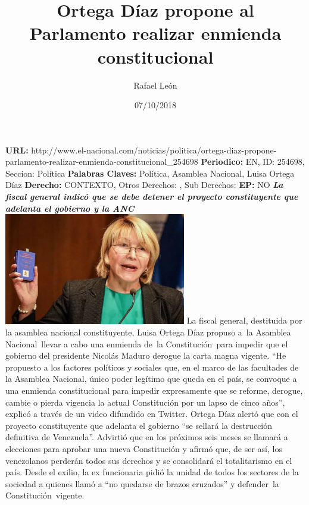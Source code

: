 \documentclass{article}%
\title{\textbf{Ortega Díaz propone al Parlamento realizar enmienda constitucional}}%
\author{Rafael León}%
\date{07/10/2018}%
\begin{document}
%
\normalsize%
\maketitle%
\textbf{URL: }%
http://www.el{-}nacional.com/noticias/politica/ortega{-}diaz{-}propone{-}parlamento{-}realizar{-}enmienda{-}constitucional\_254698\newline%
%
\textbf{Periodico: }%
EN, %
ID: %
254698, %
Seccion: %
Política\newline%
%
\textbf{Palabras Claves: }%
Política, Asamblea Nacional, Luisa Ortega Díaz\newline%
%
\textbf{Derecho: }%
CONTEXTO, %
Otros Derechos: %
, %
Sub Derechos: %
\newline%
%
\textbf{EP: }%
NO\newline%
\newline%
%
\textbf{\textit{La fiscal general indicó que se debe detener el proyecto constituyente que adelanta el gobierno y la ANC}}%
\newline%
\newline%
%
\includegraphics[width=300px]{17.jpg}%
\newline%
%
La fiscal general, destituida por la asamblea nacional constituyente, Luisa Ortega Díaz propuso a~la Asamblea Nacional~llevar a cabo una enmienda de~la Constitución~para impedir que el gobierno del presidente Nicolás Maduro derogue la carta magna vigente.%
\newline%
%
“He propuesto a los factores políticos y sociales que, en el marco de las facultades de la Asamblea Nacional, único poder legítimo que queda en el país, se convoque a una enmienda constitucional para impedir expresamente que se reforme, derogue, cambie o pierda vigencia la actual Constitución por un lapso de cinco años”, explicó a través de un video difundido en Twitter.%
\newline%
%
Ortega Díaz alertó que con el proyecto constituyente que adelanta el gobierno “se sellará la destrucción definitiva de Venezuela”. Advirtió que en los próximos seis meses se llamará a elecciones para aprobar una nueva Constitución y afirmó que, de ser así, los venezolanos perderán todos sus derechos y se consolidará el totalitarismo en el país.%
\newline%
%
Desde el exilio, la ex funcionaria pidió la unidad de todos los sectores de la sociedad a quienes llamó a “no quedarse de brazos cruzados” y defender~la Constitución~vigente.%
\newline%
%
\end{document}
